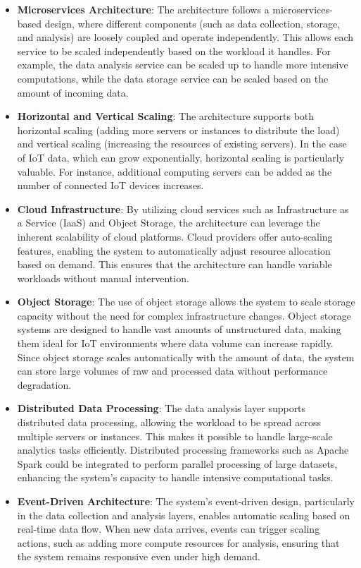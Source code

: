 \begin{itemize}
    \item \textbf{Microservices Architecture}: The architecture follows a microservices-based design, where different components (such as data collection, storage, and analysis) are loosely coupled and operate independently. This allows each service to be scaled independently based on the workload it handles. For example, the data analysis service can be scaled up to handle more intensive computations, while the data storage service can be scaled based on the amount of incoming data.
    
    \item \textbf{Horizontal and Vertical Scaling}: The architecture supports both horizontal scaling (adding more servers or instances to distribute the load) and vertical scaling (increasing the resources of existing servers). In the case of IoT data, which can grow exponentially, horizontal scaling is particularly valuable. For instance, additional computing servers can be added as the number of connected IoT devices increases. 
    
    \item \textbf{Cloud Infrastructure}: By utilizing cloud services such as Infrastructure as a Service (IaaS) and Object Storage, the architecture can leverage the inherent scalability of cloud platforms. Cloud providers offer auto-scaling features, enabling the system to automatically adjust resource allocation based on demand. This ensures that the architecture can handle variable workloads without manual intervention.

    \item \textbf{Object Storage}: The use of object storage allows the system to scale storage capacity without the need for complex infrastructure changes. Object storage systems are designed to handle vast amounts of unstructured data, making them ideal for IoT environments where data volume can increase rapidly. Since object storage scales automatically with the amount of data, the system can store large volumes of raw and processed data without performance degradation.
    
    \item \textbf{Distributed Data Processing}: The data analysis layer supports distributed data processing, allowing the workload to be spread across multiple servers or instances. This makes it possible to handle large-scale analytics tasks efficiently. Distributed processing frameworks such as Apache Spark could be integrated to perform parallel processing of large datasets, enhancing the system’s capacity to handle intensive computational tasks.

    \item \textbf{Event-Driven Architecture}: The system's event-driven design, particularly in the data collection and analysis layers, enables automatic scaling based on real-time data flow. When new data arrives, events can trigger scaling actions, such as adding more compute resources for analysis, ensuring that the system remains responsive even under high demand.
\end{itemize}

